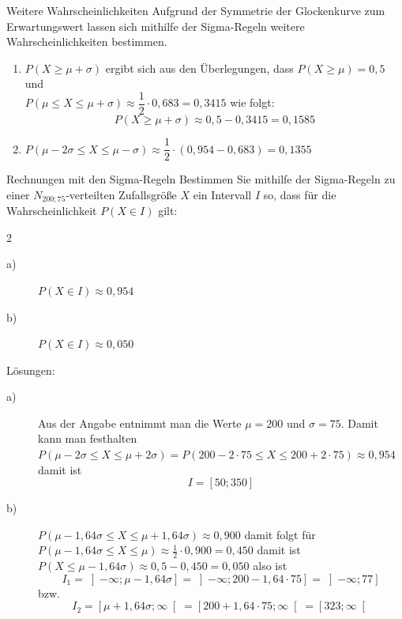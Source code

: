 \begin{b8d}{Weitere Wahrscheinlichkeiten}{}
Aufgrund der Symmetrie der Glockenkurve zum Erwartungswert lassen sich mithilfe der Sigma-Regeln weitere Wahrscheinlichkeiten bestimmen.
\begin{enumerate}
    \item \(P(X\geq \mu + \sigma)\) ergibt sich aus den Überlegungen, dass \(P(X\geq \mu) = 0{,}5 \) und \\ \(P(\mu \leq X \leq \mu + \sigma) \approx \dfrac{1}{2}\cdot 0{,}683 = 0{,}3415\) wie folgt:
    \[P(X\geq \mu + \sigma) \approx 0{,}5 - 0{,}3415 = 0{,}1585\]
    \item \(P(\mu -2\sigma \leq X \leq \mu -\sigma) \approx \dfrac{1}{2} \cdot \left( 0{,}954 - 0{,}683 \right) = 0{,}1355  \)
\end{enumerate}
\end{b8d}
\begin{rechnung}{Rechnungen mit den Sigma-Regeln}{}
    Bestimmen Sie mithilfe der Sigma-Regeln zu einer \(N_{200;75}\)-verteilten Zufallsgröße \(X\) ein Intervall \(I\) so, dass für die Wahrscheinlichkeit \(P(X\in I)\) gilt:
    \begin{multicols}{2}
    \begin{description}
        \item[a)] \(P(X\in I) \approx 0{,}954\)
        \item[b)] \(P(X\in I)\approx 0{,}050\) 
    \end{description}
    \end{multicols}
    Lösungen:
    \begin{description}
        \item[a)] Aus der Angabe entnimmt man die Werte \(\mu = 200\) und \(\sigma = 75\). Damit kann man festhalten \(P(\mu-2\sigma \leq X \leq \mu+2\sigma) = P(200 - 2\cdot 75 \leq X\leq 200 + 2\cdot 75)\approx 0{,}954\) damit ist \[I=\left[50;350\right]\] 
        \item[b)] \(P(\mu-1{,}64\sigma \leq X\leq \mu+1{,}64\sigma) \approx 0{,}900\) damit folgt für \\ \(P(\mu-1{,}64\sigma \leq X \leq \mu) \approx \frac{1}{2} \cdot 0{,}900 = 0{,}450\) damit ist \(P(X\leq\mu-1{,}64\sigma) \approx 0{,}5-0{,}450 = 0{,}050\) also ist \[I_1=\left]-\infty; \mu-1{,}64\sigma\right] = \left]-\infty;200- 1{,}64 \cdot 75\right] = \left]-\infty; 77\right]\] bzw. \[I_2 = \left[\mu+1{,}64\sigma; \infty\right[ = \left[200 + 1{,}64 \cdot 75; \infty\right[ = \left[323; \infty\right[\]
    
    \end{description}
\end{rechnung}